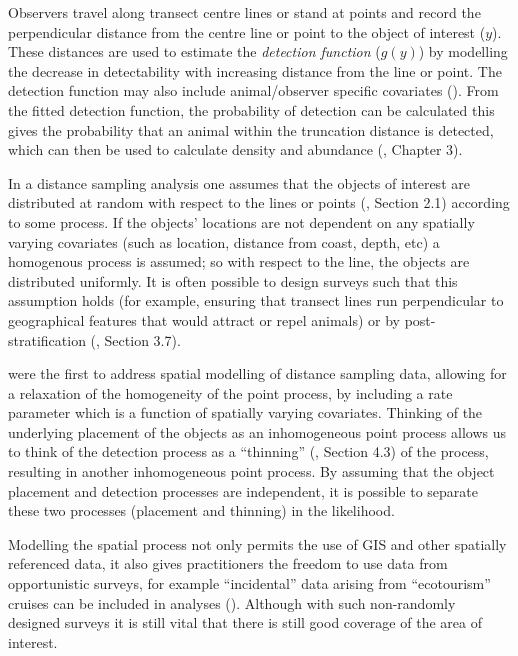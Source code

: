 \documentclass[a4paper,12pt]{article}
\begin{document}
Observers travel along transect centre lines or stand at points and record the perpendicular distance from the centre line or point to the object of interest ($y$). These distances are used to estimate the \textit{detection function} ($g(y)$) by modelling the decrease in detectability with increasing distance from the line or point. The detection function may also include animal/observer specific covariates (\cite{Marques:2007vm}). From the fitted detection function, the probability of detection can be calculated this gives the probability that an animal within the truncation distance is detected, which can then be used to calculate density and abundance (\cite{Buckland:2001vm}, Chapter 3).

In a distance sampling analysis one assumes that the objects of interest are distributed at random with respect to the lines or points (\cite{Buckland:2001vm}, Section 2.1) according to some process. If the objects' locations are not dependent on any spatially varying covariates (such as location, distance from coast, depth, etc) a homogenous process is assumed; so with respect to the line, the objects are distributed uniformly. It is often possible to design surveys such that this assumption holds (for example, ensuring that transect lines run perpendicular to geographical features that would attract or repel animals) or by post-stratification (\cite{Buckland:2001vm}, Section 3.7). 

\cite{Hedley:2004et} were the first to address spatial modelling of distance sampling data, allowing for a relaxation of the homogeneity of the point process, by including a rate parameter which is a function of spatially varying covariates. Thinking of the underlying placement of the objects as an inhomogeneous point process allows us to think of the detection process as a ``thinning'' (\cite{cox1980point}, Section 4.3) of the process, resulting in another inhomogeneous point process. By assuming that the object placement and detection processes are independent, it is possible to separate these two processes (placement and thinning) in the likelihood.

Modelling the spatial process not only permits the use of GIS and other spatially referenced data, it also gives practitioners the freedom to use data from opportunistic surveys, for example ``incidental'' data arising from ``ecotourism'' cruises can be included in analyses (\cite{Williams:2006tz}). Although with such non-randomly designed surveys it is still vital that there is still good coverage of the area of interest.
\end{document}
